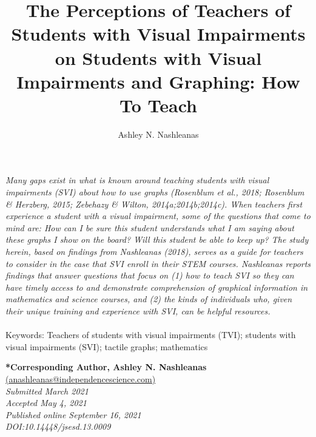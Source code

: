 \documentclass[11.5pt]{sig-alternate} %
\makeatletter
\let\oldabstract\abstract
\let\oldendabstract\endabstract
\renewenvironment{abstract} %
{\renewenvironment{quotation}%
               {\list{}{\addtolength{\leftmargin}{1em} %
                        \listparindent 1.5em%
                        \itemindent    \listparindent%
                        \rightmargin   \leftmargin%
                        \parsep        \z@ \@plus\p@}%
                \item\relax}%
               {\endlist}%
\oldabstract}
{\oldendabstract}
\makeatother
\begin{document}
\title{The Perceptions of Teachers of Students with Visual Impairments on Students with Visual Impairments and Graphing: How To Teach}

\author[1]{\large \color{blue}Ashley N. Nashleanas}


\toappear{}
\maketitle
\begin{@twocolumnfalse} 
\begin{abstract}
\item 
 \textit {Many gaps exist in what is known around teaching students with visual impairments (SVI) about how to use graphs (Rosenblum et al., 2018; Rosenblum \& Herzberg, 2015; Zebehazy \& Wilton, 2014a;2014b;2014c). When teachers first experience a student with a visual impairment, some of the questions that come to mind are: How can I be sure this student understands what I am saying about these graphs I show on the board? Will this student be able to keep up? The study herein, based on findings from Nashleanas (2018), serves as a guide for teachers to consider in the case that SVI enroll in their STEM courses. Nashleanas reports findings that answer questions that focus on (1) how to teach SVI so they can have timely access to and demonstrate comprehension of graphical information in mathematics and science courses, and (2) the kinds of individuals who, given their unique training and experience with SVI, can be helpful resources.}
     \\
     \\
     Keywords: Teachers of students with visual impairments (TVI); students with visual impairments (SVI); tactile graphs; mathematics
\end{abstract}
\end{@twocolumnfalse}


\textbf{*Corresponding Author, Ashley N. Nashleanas }\\
\href{mailto: anashleanas@independencescience.com}{(anashleanas@independencescience.com)} \\
\textit{Submitted March 2021 }\\
\textit{Accepted May 4, 2021} \\
\textit{Published online September 16, 2021} \\
\textit{DOI:10.14448/jsesd.13.0009} \\
\end{document}
